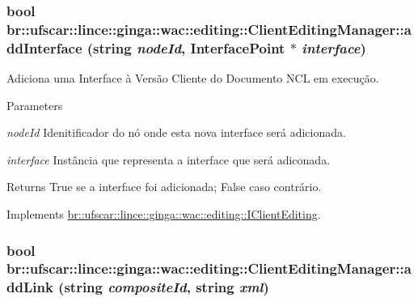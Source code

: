 \hypertarget{classbr_1_1ufscar_1_1lince_1_1ginga_1_1wac_1_1editing_1_1ClientEditingManager_a7e6eaecc65141d2660bdb1b1c33c421f}{
\subsubsection[{addInterface}]{\setlength{\rightskip}{0pt plus 5cm}bool br::ufscar::lince::ginga::wac::editing::ClientEditingManager::addInterface (string {\em nodeId}, \/  InterfacePoint $\ast$ {\em interface})}}
\label{classbr_1_1ufscar_1_1lince_1_1ginga_1_1wac_1_1editing_1_1ClientEditingManager_a7e6eaecc65141d2660bdb1b1c33c421f}


Adiciona uma Interface à Versão Cliente do Documento NCL em execução. 


\begin{DoxyParams}{Parameters}
\item[{\em nodeId}]Idenitificador do nó onde esta nova interface será adicionada. \item[{\em interface}]Instância que representa a interface que será adiconada. \end{DoxyParams}
\begin{DoxyReturn}{Returns}
True se a interface foi adicionada; False caso contrário. 
\end{DoxyReturn}


Implements \hyperlink{classbr_1_1ufscar_1_1lince_1_1ginga_1_1wac_1_1editing_1_1IClientEditing_a7a733528927ed22d232ae58e0539b1eb}{br::ufscar::lince::ginga::wac::editing::IClientEditing}.

\hypertarget{classbr_1_1ufscar_1_1lince_1_1ginga_1_1wac_1_1editing_1_1ClientEditingManager_a88c07d75d150d08724ec077fa54f2aeb}{
\subsubsection[{addLink}]{\setlength{\rightskip}{0pt plus 5cm}bool br::ufscar::lince::ginga::wac::editing::ClientEditingManager::addLink (string {\em compositeId}, \/  string {\em xml})}}
\label{classbr_1_1ufscar_1_1lince_1_1ginga_1_1wac_1_1editing_1_1ClientEditingManager_a88c07d75d150d08724ec077fa54f2aeb}



